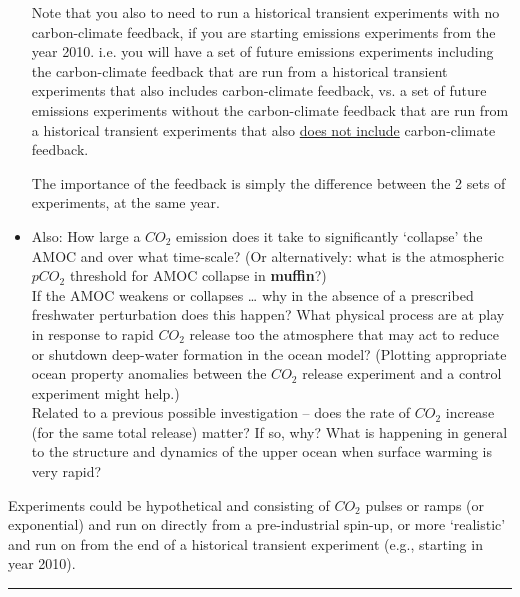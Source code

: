 \begin{itemize}[noitemsep]
Note that you also to need to run a historical transient experiments with no carbon-climate feedback, if you are starting emissions experiments from the year 2010. i.e. you will have a set of future emissions experiments including the carbon-climate feedback that are run from a historical transient experiments that also includes carbon-climate feedback, vs. a set of future emissions experiments without the carbon-climate feedback that are run from a historical transient experiments that also \uline{does not include} carbon-climate feedback.

\vspace{1mm}

The importance of the feedback is simply the difference between the 2 sets of experiments, at the same year.

\vspace{1mm}
\item Also: How large a \(CO_{2}\) emission does it take to significantly ‘collapse’ the AMOC and over what time-scale? (Or alternatively: what is the atmospheric \(pCO_{2}\) threshold for AMOC collapse in \textbf{muffin}?)
\\ If the AMOC weakens or collapses … why in the absence of a prescribed freshwater perturbation does this happen? What physical process are at play in response to rapid \(CO_{2}\) release too the atmosphere that may act to reduce or shutdown deep-water formation in the ocean model? (Plotting appropriate ocean property anomalies between the \(CO_{2}\) release experiment and a control experiment might help.)
\\Related to a previous possible investigation -- does the rate of \(CO_{2}\) increase (for the same total release) matter? If so, why? What is happening in general to the structure and dynamics of the upper ocean when surface warming is very rapid?

\end{itemize}

\vspace{2mm}
\noindent Experiments could be hypothetical and consisting of \(CO_{2}\) pulses or ramps (or exponential) and run on directly from a pre-industrial spin-up, or more ‘realistic’ and run on from the end of a historical transient experiment (e.g., starting in year 2010).

\vspace{1mm}
\noindent\rule{4cm}{0.1mm}
\vspace{2mm}

